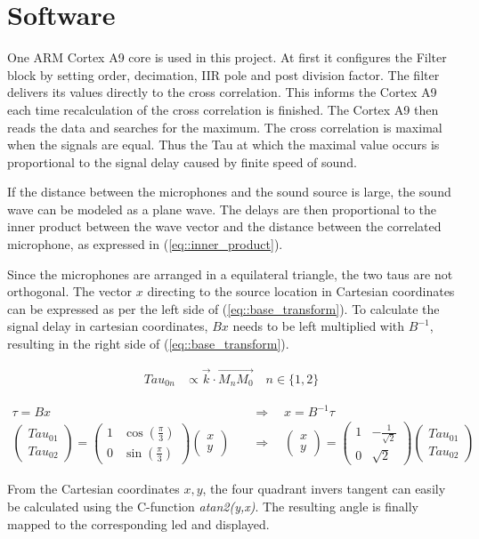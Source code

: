 \section{Software}
\label{sec::software}

One ARM Cortex A9 core is used in this project.
At first it configures the Filter block by setting order, decimation, IIR pole and post division factor.
The filter delivers its values directly to the cross correlation.
This informs the Cortex A9 each time recalculation of the cross correlation is finished.
The Cortex A9 then reads the data and searches for the maximum.
The cross correlation is maximal when the signals are equal.
Thus the Tau at which the maximal value occurs is proportional to the signal delay caused by finite speed of sound.

If the distance between the microphones and the sound source is large, the sound wave can be modeled as a plane wave.
The delays are then proportional to the inner product between the wave vector and the  distance between the correlated microphone, as expressed in (\ref{eq::inner_product}).

Since the microphones are arranged in a equilateral triangle, the two taus are not orthogonal.
The vector $x$ directing to the source location in Cartesian coordinates can be expressed as per the left side of (\ref{eq::base_transform}).
To calculate the signal delay in cartesian coordinates, $Bx$ needs to be left multiplied with $B^{-1}$, resulting in the right side of  (\ref{eq::base_transform}).

\begin{align}
	{Tau}_{0n} &\propto \overrightarrow{k} \cdot \overrightarrow{M_nM_0} \quad n\in\{1,2\}\label{eq::inner_product}
\end{align}

\begin{align}
	\tau = Bx \quad &\Rightarrow \quad x = B^{-1}\tau \label{eq::base_transform}\\
	\begin{pmatrix} {Tau}_{01} \\ {Tau}_{02}\end{pmatrix}
		=  \begin{pmatrix} 1 & \cos(\frac{\pi}{3}) \\ 0 & \sin(\frac{\pi}{3})\end{pmatrix} \begin{pmatrix} x \\ y\end{pmatrix}
	\quad &\Rightarrow \quad \begin{pmatrix} x \\ y \end{pmatrix}	= \begin{pmatrix} 1 & -\frac{1}{\sqrt{2}} \\ 0 & \sqrt{2}\end{pmatrix} \begin{pmatrix} {Tau}_{01} \\ {Tau}_{02}\end{pmatrix}
\end{align}

From the Cartesian coordinates $x,y$, the four quadrant invers tangent can easily be calculated using the C-function \emph{atan2(y,x)}.
The resulting angle is finally mapped to the corresponding led and displayed.